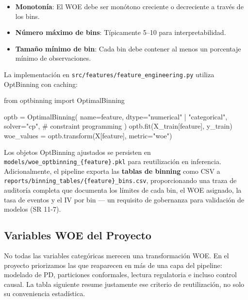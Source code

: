 \documentclass[
  spanish,
  11pt,
  letterpaper,
]{scrbook}
\newenvironment{Shaded}{\begin{snugshade}}{\end{snugshade}}
\newcommand{\CommentTok}[1]{\textcolor[rgb]{0.37,0.37,0.37}{#1}}
\newcommand{\ImportTok}[1]{\textcolor[rgb]{0.00,0.46,0.62}{#1}}
\newcommand{\NormalTok}[1]{\textcolor[rgb]{0.00,0.23,0.31}{#1}}
\newcommand{\OperatorTok}[1]{\textcolor[rgb]{0.37,0.37,0.37}{#1}}
\newcommand{\StringTok}[1]{\textcolor[rgb]{0.13,0.47,0.30}{#1}}
\providecommand{\tightlist}{%
  \setlength{\itemsep}{0pt}\setlength{\parskip}{0pt}}
\theoremstyle{plain}
\theoremstyle{remark}
\begin{document}
\begin{itemize}
\tightlist
\item
  \textbf{Monotonía}: El WOE debe ser monótono creciente o decreciente a
  través de los bins.
\item
  \textbf{Número máximo de bins}: Típicamente 5--10 para
  interpretabilidad.
\item
  \textbf{Tamaño mínimo de bin}: Cada bin debe contener al menos un
  porcentaje mínimo de observaciones.
\end{itemize}

La implementación en \texttt{src/features/feature\_engineering.py}
utiliza OptBinning con caching:

\begin{Shaded}
\begin{Highlighting}[]
\ImportTok{from}\NormalTok{ optbinning }\ImportTok{import}\NormalTok{ OptimalBinning}

\NormalTok{optb }\OperatorTok{=}\NormalTok{ OptimalBinning(}
\NormalTok{    name}\OperatorTok{=}\NormalTok{feature,}
\NormalTok{    dtype}\OperatorTok{=}\StringTok{"numerical"} \OperatorTok{|} \StringTok{"categorical"}\NormalTok{,}
\NormalTok{    solver}\OperatorTok{=}\StringTok{"cp"}\NormalTok{,  }\CommentTok{\# constraint programming}
\NormalTok{)}
\NormalTok{optb.fit(X\_train[feature], y\_train)}
\NormalTok{woe\_values }\OperatorTok{=}\NormalTok{ optb.transform(X[feature], metric}\OperatorTok{=}\StringTok{"woe"}\NormalTok{)}
\end{Highlighting}
\end{Shaded}

Los objetos OptBinning ajustados se persisten en
\texttt{models/woe\_optbinning\_\{feature\}.pkl} para reutilización en
inferencia. Adicionalmente, el pipeline exporta las \textbf{tablas de
binning} como CSV a
\texttt{reports/binning\_tables/\{feature\}\_bins.csv}, proporcionando
una traza de auditoría completa que documenta los límites de cada bin,
el WOE asignado, la tasa de eventos y el IV por bin --- un requisito de
gobernanza para validación de modelos (SR 11-7).

\subsection{Variables WOE del
Proyecto}\label{variables-woe-del-proyecto}

No todas las variables categóricas merecen una transformación WOE. En el
proyecto priorizamos las que reaparecen en más de una capa del pipeline:
modelado de PD, particiones conformales, lectura regulatoria e incluso
control causal. La tabla siguiente resume justamente ese criterio de
reutilización, no solo su conveniencia estadística.
\end{document}

